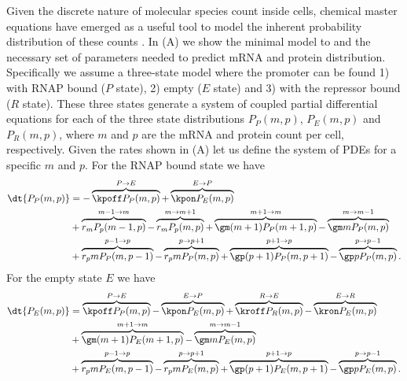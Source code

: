 Given the discrete nature of molecular species count inside cells, chemical
master equations have emerged as a useful tool to model the inherent probability
distribution of these counts \cite{Sanchez2013}. In (A)
we show the minimal model to and the necessary set of parameters needed to
predict mRNA and protein distribution. Specifically we assume a three-state
model where the promoter can be found 1) with RNAP bound ($P$ state), 2) empty
($E$ state) and 3) with the repressor bound ($R$ state). These three states
generate a system of coupled partial differential equations for each of the
three state distributions $P_P(m, p)$, $P_E(m, p)$ and $P_R(m, p)$, where $m$
and $p$ are the mRNA and protein count per cell, respectively. Given the rates
shown in (A) let us define the system of PDEs for a
specific $m$ and $p$. For the RNAP bound state we have
\begin{equation}
  \begin{aligned}
    \dt{P_P(m, p)} &=
    - \overbrace{\kpoff P_P(m, p)}^{P \rightarrow E} %
    + \overbrace{\kpon P_E(m, p)}^{E \rightarrow P}\\ %
    &+ \overbrace{r_m P_p(m-1, p)}^{m-1 \rightarrow m} %
    - \overbrace{r_m P_p(m, p)}^{m \rightarrow m+1}%
    + \overbrace{\gm (m + 1) P_P(m+1 , p)}^{m+1 \rightarrow m} %
    - \overbrace{\gm m P_P(m , p)}^{m \rightarrow m-1}\\ %
    &+ \overbrace{r_p m P_P(m, p - 1)}^{p-1 \rightarrow p} %
    - \overbrace{r_p m P_P(m, p)}^{p \rightarrow p+1} %
    + \overbrace{\gp (p + 1) P_P(m, p + 1)}^{p + 1 \rightarrow p} %
    - \overbrace{\gp p P_P(m, p)}^{p \rightarrow p-1}. %
  \end{aligned}
\end{equation}
For the empty state $E$ we have
\begin{equation}
  \begin{aligned}
    \dt{P_E(m, p)} &=
    \overbrace{\kpoff P_P(m, p)}^{P \rightarrow E} %
    - \overbrace{\kpon P_E(m, p)}^{E \rightarrow P} %
    + \overbrace{\kroff P_R(m, p)}^{R \rightarrow E} %
    - \overbrace{\kron P_E(m, p)}^{E \rightarrow R}\\ %
    &+ \overbrace{\gm (m + 1) P_E(m+1 , p)}^{m+1 \rightarrow m} %
    - \overbrace{\gm m P_E(m , p)}^{m \rightarrow m-1}\\ %
    &+ \overbrace{r_p m P_E(m, p - 1)}^{p-1 \rightarrow p} %
    - \overbrace{r_p m P_E(m, p)}^{p \rightarrow p+1} %
    + \overbrace{\gp (p + 1) P_E(m, p + 1)}^{p + 1 \rightarrow p} %
    - \overbrace{\gp p P_E(m, p)}^{p \rightarrow p-1}. %
  \end{aligned}
\end{equation}
